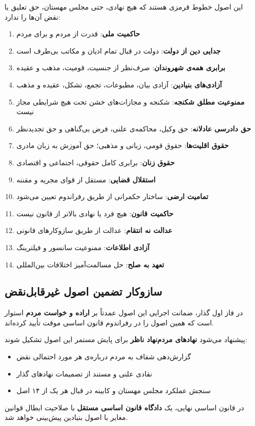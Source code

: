 این اصول خطوط قرمزی هستند که هیچ نهادی، حتی مجلس مهستان، حق تعلیق یا نقض آن‌ها را ندارد:

\begin{enumerate}
	\item \textbf{حاکمیت ملی}: قدرت از مردم و برای مردم
	\item \textbf{جدایی دین از دولت}: دولت در قبال تمام ادیان و مکاتب بی‌طرف است
	\item \textbf{برابری همه‌ی شهروندان}: صرف‌نظر از جنسیت، قومیت، مذهب و عقیده
	\item \textbf{آزادی‌های بنیادین}: آزادی بیان، مطبوعات، تجمع، تشکل، عقیده و مذهب
	\item \textbf{ممنوعیت مطلق شکنجه}: شکنجه و مجازات‌های خشن تحت هیچ شرایطی مجاز نیست
	\item \textbf{حق دادرسی عادلانه}: حق وکیل، محاکمه‌ی علنی، فرض بی‌گناهی و حق تجدیدنظر
	\item \textbf{حقوق اقلیت‌ها}: حقوق قومی، زبانی و مذهبی؛ حق آموزش به زبان مادری
	\item \textbf{حقوق زنان}: برابری کامل حقوقی، اجتماعی و اقتصادی
	\item \textbf{استقلال قضایی}: مستقل از قوای مجریه و مقننه
	\item \textbf{تمامیت ارضی}: ساختار حکمرانی از طریق رفراندوم تعیین می‌شود
	\item \textbf{حاکمیت قانون}: هیچ فرد یا نهادی بالاتر از قانون نیست
	\item \textbf{عدالت نه انتقام}: عدالت از طریق سازوکارهای قانونی
	\item \textbf{آزادی اطلاعات}: ممنوعیت سانسور و فیلترینگ
	\item \textbf{تعهد به صلح}: حل مسالمت‌آمیز اختلافات بین‌المللی
\end{enumerate}

\vspace{1em}
\subsection*{سازوکار تضمین اصول غیرقابل‌نقض}

\begin{infobox}
	در فاز اول گذار، ضمانت اجرایی این اصول عمدتاً بر \textbf{اراده و خواست مردم} استوار
	است که همین اصول را در رفراندوم قانون اساسی موقت تأیید کرده‌اند.
	
	پیشنهاد می‌شود \textbf{نهادهای مردم‌نهاد ناظر} برای پایش مستمر این اصول تشکیل شوند:
	\begin{itemize}
		\item گزارش‌دهی شفاف به مردم درباره‌ی هر مورد احتمالی نقض
		\item نقادی علنی و مستند از تصمیمات نهادهای گذار
		\item سنجش عملکرد مجلس مهستان و کابینه در قبال هر یک از ۱۴ اصل
	\end{itemize}
	
	در قانون اساسی نهایی، یک \textbf{دادگاه قانون اساسی مستقل} با صلاحیت ابطال قوانین
	مغایر با اصول بنیادین پیش‌بینی خواهد شد.
\end{infobox}

